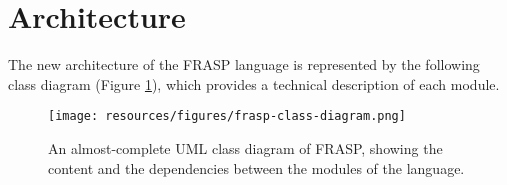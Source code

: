 
\section{Architecture}
\label{section:implementation:architecture}

The new architecture of the FRASP language is represented by the following
class diagram (Figure \ref{figure:frasp-class-diagram}), which provides a
technical description of each module.

\begin{figure}[!ht]
  \centering
  \texttt{[image: resources/figures/frasp-class-diagram.png]}
  \caption[An updated UML class diagram of FRASP]{
    An almost-complete UML class diagram of FRASP, showing the
    content and the dependencies between the modules of the language.
  }
  \label{figure:frasp-class-diagram}
\end{figure}